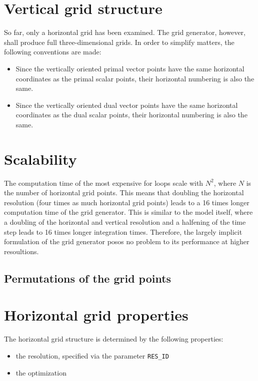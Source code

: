 \documentclass[10pt]{report}
\begin{document}
\section{Vertical grid structure}
\label{sec:vertical_grid_structure}

So far, only a horizontal grid has been examined. The grid generator, however, shall produce full three-dimensional grids. In order to simplify matters, the following conventions are made:
%
\begin{itemize}
\item Since the vertically oriented primal vector points have the same horizontal coordinates as the primal scalar points, their horizontal numbering is also the same.
\item Since the vertically oriented dual vector points have the same horizontal coordinates as the dual scalar points, their horizontal numbering is also the same.
\end{itemize}

\section{Scalability}
\label{sec:scalability}

The computation time of the most expensive for loops scale with $N^2$, where $N$ is the number of horizontal grid points. This means that doubling the horizontal resolution (four times as much horizontal grid points) leads to a 16 times longer computation time of the grid generator. This is similar to the model itself, where a doubling of the horizontal and vertical resolution and a halfening of the time step leads to 16 times longer integration times. Therefore, the largely implicit formulation of the grid generator posos no problem to its performance at higher resoultions.

\subsection{Permutations of the grid points}
\label{sec:permutations_of_the_grid_points}

\section{Horizontal grid properties}
\label{sec:horizontal_grid_properties}

The horizontal grid structure is determined by the following properties:

\begin{itemize}
\item the resolution, specified via the parameter \texttt{RES\_ID}
\item the optimization
\end{itemize}
\end{document}
